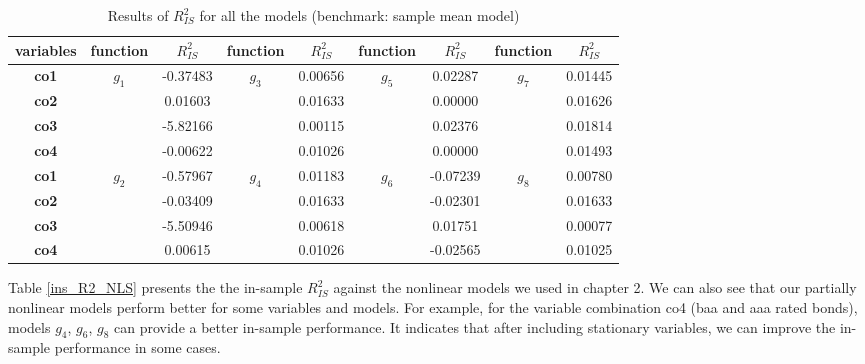 \documentclass[a4paper,12pt,times,numbered,print,index]{report}
\numberwithin{equation}{section}
\begin{document}
\begin{table}[!htbp]
	\centering
	\caption{Results of $R^2_{IS}$ for all the models (benchmark: sample mean model)}
	\begin{adjustbox}{max width=\textwidth}
	\begin{tabular}{ccccccccc}
		\toprule
		\textbf{variables} & \textbf{function} & \textbf{$R^2_{IS}$} & \textbf{function} & \textbf{$R^2_{IS}$} & \textbf{function} & \textbf{$R^2_{IS}$} & \textbf{function} & \textbf{$R^2_{IS}$} \\
		\midrule
		\textbf{co1} & \multirow{4}[1]{*}{\textbf{$g_1$}} & -0.37483 & \multirow{4}[1]{*}{\textbf{$g_3$}} & 0.00656 & \multirow{4}[1]{*}{\textbf{$g_5$}} & 0.02287 & \multirow{4}[1]{*}{\textbf{$g_7$}} & 0.01445 \\
		\textbf{co2} &       & 0.01603 &       & 0.01633 &       & 0.00000 &       & 0.01626 \\
		\textbf{co3} &       & -5.82166 &       & 0.00115 &       & 0.02376 &       & 0.01814 \\
		\textbf{co4} &       & -0.00622 &       & 0.01026 &       & 0.00000 &       & 0.01493 \\
		\midrule
		\textbf{co1} & \multirow{4}[1]{*}{\textbf{$g_2$}} & -0.57967 & \multirow{4}[1]{*}{\textbf{$g_4$}} & 0.01183 & \multirow{4}[1]{*}{\textbf{$g_6$}} & -0.07239 & \multirow{4}[1]{*}{\textbf{$g_8$}} & 0.00780 \\
		\textbf{co2} &       & -0.03409 &       & 0.01633 &       & -0.02301 &       & 0.01633 \\
		\textbf{co3} &       & -5.50946 &       & 0.00618 &       & 0.01751 &       & 0.00077 \\
		\textbf{co4} &       & 0.00615 &       & 0.01026 &       & -0.02565 &       & 0.01025 \\
		\bottomrule
		\bottomrule
	\end{tabular}%
	\end{adjustbox}
\label{ins_R2}%
\end{table}%

Table \ref{ins_R2_NLS} presents the the in-sample $R^2_{IS}$ against the nonlinear models we used in chapter 2. We can also see that our partially nonlinear models perform better for some variables and models. For example, for the variable combination co4 (baa and aaa rated bonds), models $g_4$, $g_6$, $g_8$ can provide a better in-sample performance. It indicates that after including stationary variables, we can improve the in-sample performance in some cases. 
\end{document}
